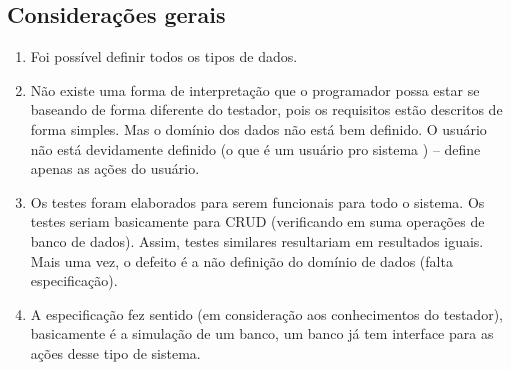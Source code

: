 \documentclass[12pt,a4paper,final]{report}
\begin{document}
\subsection*{Considerações gerais}
\begin{enumerate}


\item Foi possível definir todos os tipos de dados.








\item Não existe uma forma de interpretação que o programador possa estar se baseando de forma diferente do testador, pois os requisitos estão descritos de forma simples. Mas o domínio dos dados não está bem definido. O usuário não está devidamente definido (o que é um usuário pro sistema ) -- define apenas as ações do usuário. 

\item Os testes foram elaborados para serem funcionais para todo o sistema. Os testes seriam basicamente para CRUD (verificando em suma operações de banco de dados). Assim, testes similares resultariam em resultados iguais. Mais uma vez, o defeito é a não definição do domínio de dados (falta especificação).

\item A especificação fez sentido (em consideração aos conhecimentos do testador), basicamente é a simulação de um banco, um banco já tem interface para as ações desse tipo de sistema. 
\end{enumerate}
\newpage
\end{document}
